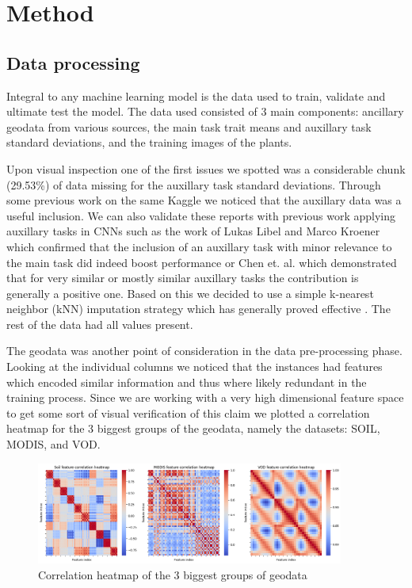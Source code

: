 \documentclass[12pt,a4paper,oneside]{article}
\begin{document}

\section{Method}

\subsection{Data processing}

Integral to any machine learning model is the data used to train, validate and ultimate test the model. The data used consisted of 3 main components: ancillary geodata from various sources, the main task trait means and auxillary task standard deviations, and the training images of the plants.

\smallskip 
Upon visual inspection one of the first issues we spotted was a considerable chunk (29.53\%) of data missing for the auxillary task standard deviations. Through some previous work on the same Kaggle we noticed that the auxillary data was a useful inclusion. We can also validate these reports with previous work applying auxillary tasks in CNNs such as the work of Lukas Libel and Marco Kroener which confirmed that the inclusion of an auxillary task with minor relevance to the main task did indeed boost performance \cite{lukaslibel} or Chen et. al. \cite{pmlr-v80-chen18a} which demonstrated that for very similar or mostly similar auxillary tasks the contribution is generally a positive one. Based on this we decided to use a simple k-nearest neighbor (kNN) imputation strategy which has generally proved effective \cite{joel2024performance}. The rest of the data had all values present.

\smallskip
The geodata was another point of consideration in the data pre-processing phase. Looking at the individual columns we noticed that the instances had features which encoded similar information and thus where likely redundant in the training process. Since we are working with a very high dimensional feature space to get some sort of visual verification of this claim we plotted a correlation heatmap for the 3 biggest groups of the geodata, namely the datasets: SOIL, MODIS, and VOD.

\begin{figure}[!h]
    \centering
    \includegraphics[width=0.9\textwidth]{assets/corr_hm.png}
    \caption{Correlation heatmap of the 3 biggest groups of geodata}
\end{figure}
\end{document}

